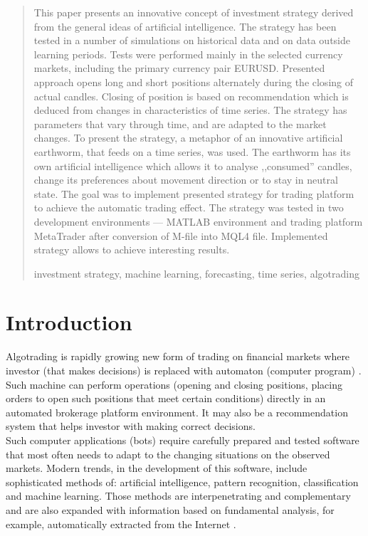 \documentclass[runningheads,a4paper]{llncs}
\newcommand{\keywords}[1]{\par\addvspace\baselineskip
\noindent\keywordname\enspace\ignorespaces#1}
\begin{document}
\begin{abstract}
This paper presents an innovative concept of investment strategy derived from the general ideas of artificial intelligence. The strategy has been tested in a number of simulations on historical data and on data outside learning periods. Tests were performed mainly in the selected currency markets, including the primary currency pair EURUSD. Presented approach opens long and short positions alternately during the closing of actual candles. Closing of position is based on recommendation which is deduced from changes in characteristics of time series. The strategy has parameters that vary through time, and are adapted to the market changes. To present the strategy, a metaphor of an innovative artificial earthworm, that feeds on a time series, was used. The earthworm has its own artificial intelligence which allows it to analyse ,,consumed'' candles, change its preferences about movement direction or to stay in neutral state. The goal was to implement presented strategy for trading platform to achieve the automatic trading effect.  The strategy was tested in two development environments --- MATLAB environment and trading platform MetaTrader after conversion of M-file into MQL4 file. Implemented strategy allows to achieve interesting results.
\keywords{investment strategy, machine learning, forecasting, time series, algotrading}
\end{abstract}


\section{Introduction}

Algotrading is rapidly growing new form of trading on financial markets where investor (that makes decisions) is replaced with automaton (computer program) \cite{Leshik2011}. Such machine can perform operations (opening and closing positions, placing orders to open such positions that meet certain conditions) directly in an automated brokerage platform environment. It may also be a recommendation system that helps investor with making correct decisions.\\

Such computer applications (bots) require carefully prepared and tested software that most often needs to adapt to the changing situations on the observed markets. Modern trends, in the development of this software, include sophisticated methods of: artificial intelligence, pattern recognition, classification and machine learning. Those methods are interpenetrating and complementary and are also expanded with information based on fundamental analysis, for example, automatically extracted from the Internet \cite{elder}\cite{Wilinski2014}\cite{Schwager1996}.\\
\end{document}

